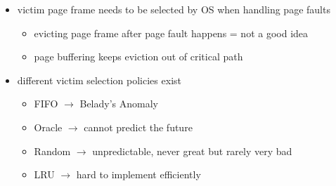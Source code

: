 \begin{summary}
  \begin{itemize}
    \item victim page frame needs to be selected by OS when handling page faults
    \begin{itemize}
      \item evicting page frame after page fault happens = not a good idea
      \item page buffering keeps eviction out of critical path
    \end{itemize}
    \item different victim selection policies exist
    \begin{itemize}
      \item FIFO $ \to $ Belady's Anomaly
      \item Oracle $ \to $ cannot predict the future
      \item Random $ \to $ unpredictable, never great but rarely very bad
      \item LRU $ \to $ hard to implement efficiently
    \end{itemize}
  \end{itemize}
\end{summary}
